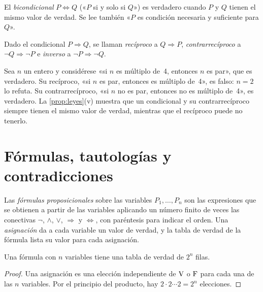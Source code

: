 \begin{definicion}[Bicondicional]\label{def:bicondicional}
El \emph{bicondicional} $P\Leftrightarrow Q$ («$P$ si y solo si $Q$») es verdadero cuando $P$ y $Q$ tienen el mismo valor de verdad. Se lee también «$P$ es condición necesaria y suficiente para $Q$».
\end{definicion}

\begin{definicion}\label{def:reciproco}
Dado el condicional $P\Rightarrow Q$, se llaman \emph{recíproco} a $Q\Rightarrow P$, \emph{contrarrecíproco} a $\neg Q\Rightarrow\neg P$ e \emph{inverso} a $\neg P\Rightarrow\neg Q$.
\end{definicion}

\begin{ejemplo}\label{ej:reciproco}
Sea $n$ un entero y considérese «si $n$ es múltiplo de~4, entonces $n$ es par», que es verdadero. Su recíproco, «si $n$ es par, entonces es múltiplo de~4», es falso: $n=2$ lo refuta. Su contrarrecíproco, «si $n$ no es par, entonces no es múltiplo de~4», es verdadero. La \cref{prop:leyes}(v) muestra que un condicional y su contrarrecíproco siempre tienen el mismo valor de verdad, mientras que el recíproco puede no tenerlo.
\end{ejemplo}

\section{Fórmulas, tautologías y contradicciones}

\begin{definicion}
Las \emph{fórmulas proposicionales} sobre las variables $P_1,\dots,P_n$ son las expresiones que se obtienen a partir de las variables aplicando un número finito de veces las conectivas $\neg$, $\wedge$, $\vee$, $\Rightarrow$ y $\Leftrightarrow$, con paréntesis para indicar el orden. Una \emph{asignación} da a cada variable un valor de verdad, y la tabla de verdad de la fórmula lista su valor para cada asignación.
\end{definicion}

\begin{proposicion}\label{prop:filas}
Una fórmula con $n$ variables tiene una tabla de verdad de $2^{n}$ filas.
\end{proposicion}

\begin{proof}
Una asignación es una elección independiente de $\mathrm{V}$ o $\mathrm{F}$ para cada una de las $n$ variables. Por el principio del producto, hay $2\cdot 2\cdots 2=2^{n}$ elecciones.
\end{proof}

